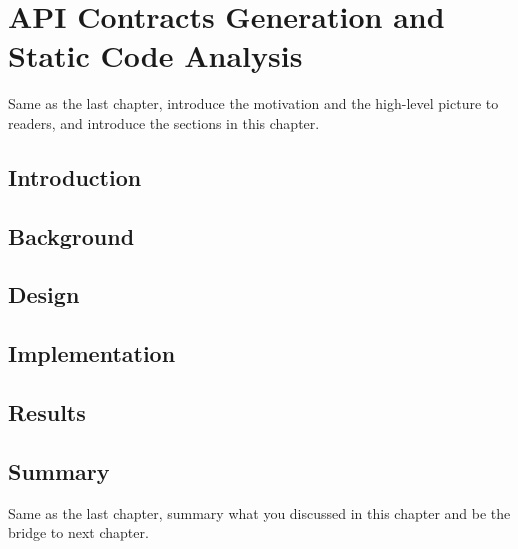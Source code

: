\chapter{API Contracts Generation and Static Code Analysis}
\label{cha:codeAnalysis}
Same as the last chapter, introduce the motivation and the high-level picture to
readers, and introduce the sections in this chapter.

\section{Introduction}

\section{Background}

\section{Design}

\section{Implementation}

\section{Results}

\section{Summary}
Same as the last chapter, summary what you discussed in this chapter and
be the bridge to next chapter.
